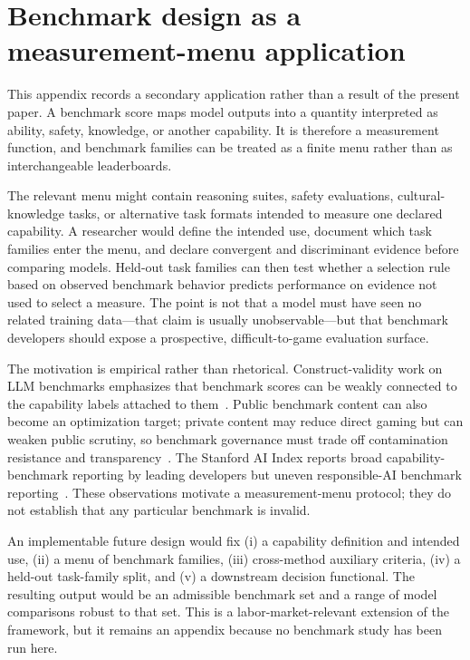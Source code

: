 \documentclass[10pt,letterpaper]{article}
\begin{document}
\section{Benchmark design as a measurement-menu application}
\label{app:bench}
This appendix records a secondary application rather than a result of the present paper. A benchmark score maps model outputs into a quantity interpreted as ability, safety, knowledge, or another capability. It is therefore a measurement function, and benchmark families can be treated as a finite menu rather than as interchangeable leaderboards.

The relevant menu might contain reasoning suites, safety evaluations, cultural-knowledge tasks, or alternative task formats intended to measure one declared capability. A researcher would define the intended use, document which task families enter the menu, and declare convergent and discriminant evidence before comparing models. Held-out task families can then test whether a selection rule based on observed benchmark behavior predicts performance on evidence not used to select a measure. The point is not that a model must have seen no related training data---that claim is usually unobservable---but that benchmark developers should expose a prospective, difficult-to-game evaluation surface.

The motivation is empirical rather than rhetorical. Construct-validity work on LLM benchmarks emphasizes that benchmark scores can be weakly connected to the capability labels attached to them~\cite{bean2025}. Public benchmark content can also become an optimization target; private content may reduce direct gaming but can weaken public scrutiny, so benchmark governance must trade off contamination resistance and transparency~\cite{truong2026}. The Stanford AI Index reports broad capability-benchmark reporting by leading developers but uneven responsible-AI benchmark reporting~\cite{hai2026}. These observations motivate a measurement-menu protocol; they do not establish that any particular benchmark is invalid.

An implementable future design would fix (i) a capability definition and intended use, (ii) a menu of benchmark families, (iii) cross-method auxiliary criteria, (iv) a held-out task-family split, and (v) a downstream decision functional. The resulting output would be an admissible benchmark set and a range of model comparisons robust to that set. This is a labor-market-relevant extension of the framework, but it remains an appendix because no benchmark study has been run here.
\end{document}
